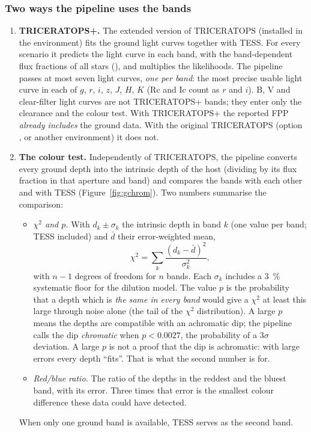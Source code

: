 \subsubsection*{Two ways the pipeline uses the bands}

\begin{enumerate}
\item \textbf{TRICERATOPS+.} The extended version of TRICERATOPS
(installed in the  environment) fits the ground light curves
together with TESS. For every scenario it predicts the light curve in each
band, with the band-dependent flux fractions of all stars
(), and multiplies the likelihoods. The pipeline
passes at most seven light curves, \emph{one per band}: the most precise
usable light curve in each of $g$, $r$, $i$, $z$, $J$, $H$, $K$ (Rc and Ic
count as $r$ and $i$). B, V and clear-filter light curves are not
TRICERATOPS+ bands; they enter only the clearance and the colour test.
With TRICERATOPS+ the reported FPP \emph{already includes} the ground data.
With the original TRICERATOPS (option , or another
environment) it does not.
\item \textbf{The colour test.} Independently of TRICERATOPS, the
pipeline converts every ground depth into the intrinsic depth of the host
(dividing by its flux fraction in that aperture and band) and compares the
bands with each other and with TESS (Figure~\ref{fig:gchrom}). Two numbers
summarise the comparison:
\begin{itemize}
\item \emph{$\chi^2$ and $p$.} With $d_k \pm \sigma_k$ the intrinsic depth
in band $k$ (one value per band; TESS included) and $\bar d$ their
error-weighted mean,
\[
\chi^2 = \sum_k \frac{(d_k - \bar d)^2}{\sigma_k^2},
\]
with $n-1$ degrees of freedom for $n$ bands. Each $\sigma_k$ includes a
3~\% systematic floor for the dilution model. The value $p$ is the
probability that a depth which is \emph{the same in every band} would give
a $\chi^2$ at least this large through noise alone (the tail of the $\chi^2$
distribution). A large $p$ means the depths are compatible with an
achromatic dip; the pipeline calls the dip \emph{chromatic} when
$p < 0.0027$, the probability of a 3$\sigma$ deviation. A large $p$ is not
a proof that the dip is achromatic: with large errors every depth
``fits''. That is what the second number is for.
\item \emph{Red/blue ratio.} The ratio of the depths in the reddest and the
bluest band, with its error. Three times that error is the smallest colour
difference these data could have detected.
\end{itemize}
When only one ground band is available, TESS serves as the second band.
\end{enumerate}

